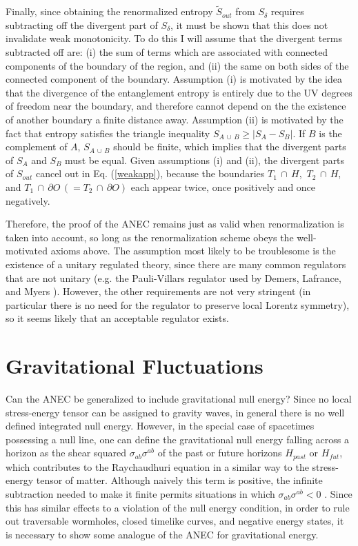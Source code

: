\documentclass[11pt]{article}
\begin{document}
Finally, since obtaining the renormalized entropy $\tilde{S}_{out}$ from $S_\delta$ requires subtracting off the divergent part of $S_\delta$, it must be shown that this does not invalidate weak monotonicity.  To do this I will assume that the divergent terms subtracted off are: (i) the sum of terms which are associated with connected components of the boundary of the region, and (ii) the same on both sides of the connected component of the boundary.  Assumption (i) is motivated by the idea that the divergence of the entanglement entropy is entirely due to the UV degrees of freedom near the boundary, and therefore cannot depend on the the existence of another boundary a finite distance away.  Assumption (ii) is motivated by the fact that entropy satisfies the triangle inequality $S_{A\,\cup\,B} \ge |S_A - S_B|$.  If $B$ is the complement of $A$, $S_{A\,\cup\,B}$ should be finite, which implies that the divergent parts of $S_A$ and $S_B$ must be equal.  Given assumptions (i) and (ii), the divergent parts of $S_{out}$ cancel out in Eq. (\ref{weakapp}), because the boundaries $T_1\,\cap\,H$, $\,T_2\,\cap\,H$, and $T_1\,\cap\,\partial O\,(= T_2\,\cap\,\partial O)$ each appear twice, once positively and once negatively.

Therefore, the proof of the ANEC remains just as valid when renormalization is taken into account, so long as the renormalization scheme obeys the well-motivated axioms above.  The assumption most likely to be troublesome is the existence of a unitary regulated theory, since there are many common regulators that are not unitary (e.g. the Pauli-Villars regulator used by Demers, Lafrance, and Myers \cite{FS94}).   However, the other requirements are not very stringent (in particular there is no need for the regulator to preserve local Lorentz symmetry), so it seems likely that an acceptable regulator exists.

\section{Gravitational Fluctuations}\label{graviton}

Can the ANEC be generalized to include gravitational null energy?  Since no local stress-energy tensor can be assigned to gravity waves, in general there is no well defined integrated null energy.  However, in the special case of spacetimes possessing a null line, one can define the gravitational null energy falling across a horizon as the shear squared $\sigma_{ab}\sigma^{ab}$ of the past or future horizons $H_{past}$ or $H_{fut}$, which contributes to the Raychaudhuri equation in a similar way to the stress-energy tensor of matter.  Although naively this term is positive, the infinite subtraction needed to make it finite permits situations in which $\sigma_{ab}\sigma^{ab} < 0$ \cite{CS77}.  Since this has similar effects to a violation of the null energy condition, in order to rule out traversable wormholes, closed timelike curves, and negative energy states, it is necessary to show some analogue of the ANEC for gravitational energy.
\end{document}

